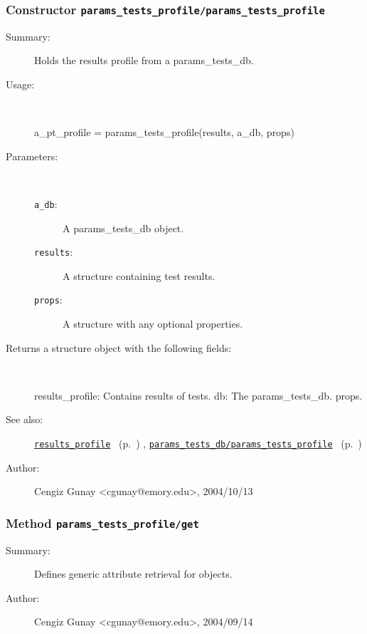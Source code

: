 \subsubsection[Constructor \texttt{params\_tests\_profile}]{Constructor \texttt{params\_tests\_profile/params\_tests\_profile}}%
%
\label{ref_params_tests_profile__params_tests_profile}%
\hypertarget{ref_params_tests_profile__params_tests_profile}{}%
\begin{description}
\item[Summary:]Holds the results profile from a params\_tests\_db.
%
\item[Usage:]~%
\begin{lyxcode}%
a\_pt\_profile = params\_tests\_profile(results, a\_db, props)
%
\end{lyxcode}%
%
%
\item[Parameters:]~
\begin{description}%
\item[\texttt{a\_db}:]
 A params\_tests\_db object.
\item[\texttt{results}:]
 A structure containing test results.
\item[\texttt{props}:]
 A structure with any optional properties.
\end{description}%
%
\item[Returns a structure object with the following fields:
]~

	results\_profile: Contains results of tests.
	db: The params\_tests\_db.
	props.
%
%
\item[See also:]%
\hyperlink{ref_results_profile}{\texttt{results\_profile}}%
\ (p.~\pageref{ref_results_profile})%
%
, \hyperlink{ref_params_tests_db__params_tests_profile}{\texttt{params\_tests\_db/params\_tests\_profile}}%
\ (p.~\pageref{ref_params_tests_db__params_tests_profile})%
%
%
\item[Author:]%
Cengiz Gunay <cgunay@emory.edu>, 2004/10/13
%
\end{description}
\methodline%
\subsubsection[Method \texttt{get}]{Method \texttt{params\_tests\_profile/get}}%
%
\label{ref_params_tests_profile__get}%
\hypertarget{ref_params_tests_profile__get}{}%
\begin{description}
\item[Summary:]Defines generic attribute retrieval for objects.
%
%
%
%
%
%
%
\item[Author:]%
Cengiz Gunay <cgunay@emory.edu>, 2004/09/14
%
\end{description}
\methodline%

